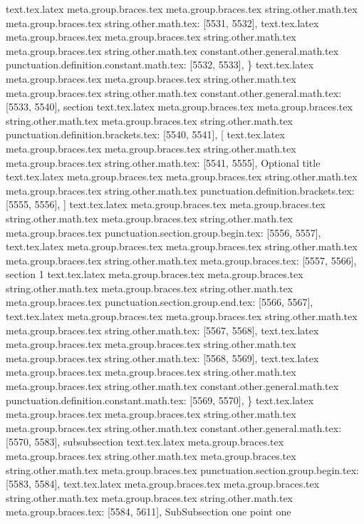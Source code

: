 {{{{{{{{{{{{{{{{{{{{{{{{{{{{{{{{{{{{{{{{{{{{{{{{{{{{{{{{{{{{{{{{{{{{{{{{{{{{{{{{{{{{{{{{{{{{{{{{{{{{{{{{{{{{{{{{{{{{{{{{{{{{{{{{{{{{{{{{{{{{{{{{{{{{{{{{}
text.tex.latex meta.group.braces.tex meta.group.braces.tex string.other.math.tex meta.group.braces.tex string.other.math.tex: [5531, 5532], {
}
text.tex.latex meta.group.braces.tex meta.group.braces.tex string.other.math.tex meta.group.braces.tex string.other.math.tex constant.other.general.math.tex punctuation.definition.constant.math.tex: [5532, 5533], {\}
text.tex.latex meta.group.braces.tex meta.group.braces.tex string.other.math.tex meta.group.braces.tex string.other.math.tex constant.other.general.math.tex: [5533, 5540], {section}
text.tex.latex meta.group.braces.tex meta.group.braces.tex string.other.math.tex meta.group.braces.tex string.other.math.tex punctuation.definition.brackets.tex: [5540, 5541], {[}
text.tex.latex meta.group.braces.tex meta.group.braces.tex string.other.math.tex meta.group.braces.tex string.other.math.tex: [5541, 5555], {Optional title}
text.tex.latex meta.group.braces.tex meta.group.braces.tex string.other.math.tex meta.group.braces.tex string.other.math.tex punctuation.definition.brackets.tex: [5555, 5556], {]}
text.tex.latex meta.group.braces.tex meta.group.braces.tex string.other.math.tex meta.group.braces.tex string.other.math.tex meta.group.braces.tex punctuation.section.group.begin.tex: [5556, 5557], {{}
text.tex.latex meta.group.braces.tex meta.group.braces.tex string.other.math.tex meta.group.braces.tex string.other.math.tex meta.group.braces.tex: [5557, 5566], {section 1}
text.tex.latex meta.group.braces.tex meta.group.braces.tex string.other.math.tex meta.group.braces.tex string.other.math.tex meta.group.braces.tex punctuation.section.group.end.tex: [5566, 5567], {}}
text.tex.latex meta.group.braces.tex meta.group.braces.tex string.other.math.tex meta.group.braces.tex string.other.math.tex: [5567, 5568], {
}
text.tex.latex meta.group.braces.tex meta.group.braces.tex string.other.math.tex meta.group.braces.tex string.other.math.tex: [5568, 5569], {
}
text.tex.latex meta.group.braces.tex meta.group.braces.tex string.other.math.tex meta.group.braces.tex string.other.math.tex constant.other.general.math.tex punctuation.definition.constant.math.tex: [5569, 5570], {\}
text.tex.latex meta.group.braces.tex meta.group.braces.tex string.other.math.tex meta.group.braces.tex string.other.math.tex constant.other.general.math.tex: [5570, 5583], {subsubsection}
text.tex.latex meta.group.braces.tex meta.group.braces.tex string.other.math.tex meta.group.braces.tex string.other.math.tex meta.group.braces.tex punctuation.section.group.begin.tex: [5583, 5584], {{}
text.tex.latex meta.group.braces.tex meta.group.braces.tex string.other.math.tex meta.group.braces.tex string.other.math.tex meta.group.braces.tex: [5584, 5611], {SubSubsection one point one}
}}}}}}}}}}}}}}}}}}}}}}}}}}}}}}}}}}}}}}}}}}}}}}}}}}}}}}}}}}}}}}}}}}}}}}}}}}}}}}}}}}}}}}}}}}}}}}}}}}}}}}}}}}}}}}}}}}}}}}}}}}}}}}}}}}}}}}}}}}}}}}}}}}}}}}}}}}
